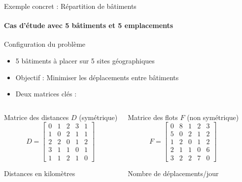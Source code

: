 \documentclass{beamer}
\begin{document}
\begin{frame}{Exemple concret : Répartition de bâtiments}
    \framesubtitle{Cas d'étude avec 5 bâtiments et 5 emplacements}

    \begin{block}{Configuration du problème}
        \begin{itemize}
            \item 5 bâtiments à placer sur 5 sites géographiques
            \item Objectif : Minimiser les déplacements entre bâtiments
            \item Deux matrices clés :
        \end{itemize}
    \end{block}

    \begin{columns}[T]
        \begin{exampleblock}{Matrice des distances \(D\) (symétrique)}
            \[
                D = \begin{bmatrix}
                    0 & 1 & 2 & 3 & 1 \\
                    1 & 0 & 2 & 1 & 1 \\
                    2 & 2 & 0 & 1 & 2 \\
                    3 & 1 & 1 & 0 & 1 \\
                    1 & 1 & 2 & 1 & 0
                \end{bmatrix}
            \]
            \begin{footnotesize}
                Distances en kilomètres
            \end{footnotesize}
        \end{exampleblock}

        \begin{exampleblock}{Matrice des flots \(F\) (non symétrique)}
            \[
                F = \begin{bmatrix}
                    0 & 8 & 1 & 2 & 3 \\
                    5 & 0 & 2 & 1 & 2 \\
                    1 & 2 & 0 & 1 & 2 \\
                    2 & 1 & 1 & 0 & 6 \\
                    3 & 2 & 2 & 7 & 0
                \end{bmatrix}
            \]
            \begin{footnotesize}
                Nombre de déplacements/jour
            \end{footnotesize}
        \end{exampleblock}
    \end{columns}

\end{frame}
\end{document}
